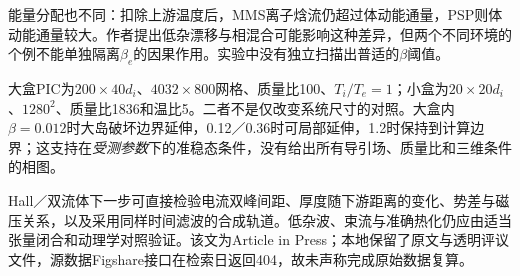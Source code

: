 能量分配也不同：扣除上游温度后，MMS离子焓流仍超过体动能通量，PSP则体动能通量较大。作者提出低杂漂移与相混合可能影响这种差异，但两个不同环境的个例不能单独隔离$\beta_e$的因果作用。实验中没有独立扫描出普适的$\beta$阈值。

大盒PIC为$200\times40d_i$、$4032\times800$网格、质量比100、$T_i/T_e=1$；小盒为$20\times20d_i$、$1280^2$、质量比1836和温比5。二者不是仅改变系统尺寸的对照。大盒内$\beta=0.012$时大岛破坏边界延伸，0.12／0.36时可局部延伸，1.2时保持到计算边界；这支持在\emph{受测参数}下的准稳态条件，没有给出所有导引场、质量比和三维条件的相图。

Hall／双流体下一步可直接检验电流双峰间距、厚度随下游距离的变化、势差与磁压关系，以及采用同样时间滤波的合成轨道。低杂波、束流与准确热化仍应由适当张量闭合和动理学对照验证。该文为Article in Press；本地保留了原文与透明评议文件，源数据Figshare接口在检索日返回404，故未声称完成原始数据复算。
